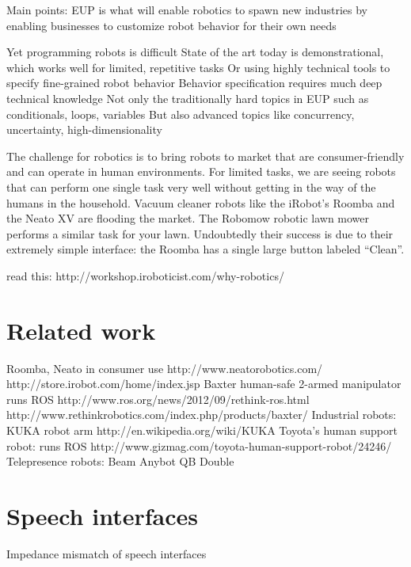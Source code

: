 \documentclass{article}
\begin{document}
Main points:
	EUP is what will enable robotics to spawn new industries
	by enabling businesses to customize robot behavior for their own needs

	Yet programming robots is difficult
	State of the art today is demonstrational, which works well for limited, repetitive tasks
	Or using highly technical tools to specify fine-grained robot behavior
	Behavior specification requires much deep technical knowledge
	Not only the traditionally hard topics in EUP such as conditionals, loops, variables
	But also advanced topics like concurrency, uncertainty, high-dimensionality

The challenge for robotics is to bring robots to market that are consumer-friendly and can operate in human environments. For limited tasks, we are seeing robots that can perform one single task very well without getting in the way of the humans in the household. Vacuum cleaner robots like the iRobot's Roomba and the Neato XV are flooding the market. The Robomow robotic lawn mower performs a similar task for your lawn. Undoubtedly their success is due to their extremely simple interface: the Roomba has a single large button labeled ``Clean''.


read this: http://workshop.iroboticist.com/why-robotics/

\section{Related work}

Roomba, Neato in consumer use
	http://www.neatorobotics.com/
	http://store.irobot.com/home/index.jsp
Baxter human-safe 2-armed manipulator
	runs ROS
	http://www.ros.org/news/2012/09/rethink-ros.html
	http://www.rethinkrobotics.com/index.php/products/baxter/
Industrial robots:
	KUKA robot arm http://en.wikipedia.org/wiki/KUKA
Toyota's human support robot:
	runs ROS
	http://www.gizmag.com/toyota-human-support-robot/24246/
Telepresence robots:
	Beam
	Anybot QB
	Double


\section{Speech interfaces}

Impedance mismatch of speech interfaces



\end{document}
